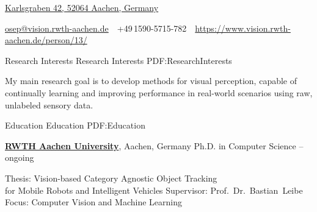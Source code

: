 \documentclass[letterpaper,MMMyyyy,nonstopmode]{simpleresumecv}
\newcommand{\CVAuthor}{Aljoša Ošep}
\newcommand{\CVWebpage}{https://www.vision.rwth-aachen.de/person/13/}
\begin{document}

\Title{\CVAuthor}

\begin{SubTitle}
\href{https://www.google.com/maps/place/Karlsgraben+42,+52064+Aachen}
{Karlsgraben 42, 52064 Aachen, Germany}
\par
\href{mailto:osep@vision.rwth-aachen.de}
{osep@vision.rwth-aachen.de}
\,\SubBulletSymbol\,
+49\,1590-5715-782
\,\SubBulletSymbol\,
\href{\CVWebpage}
{\url{\CVWebpage}}
\end{SubTitle}

\begin{Body}



\Section
{Research Interests}
{Research Interests}
{PDF:ResearchInterests}

My main research goal is to develop methods for visual perception, capable of continually learning and improving performance in real-world scenarios using raw, unlabeled sensory data.



\Section
{Education}
{Education}
{PDF:Education}


\Entry
\href{http://www.rwth-aachen.de}
{\textbf{RWTH Aachen University}},
Aachen, Germany
\Gap
\BulletItem
Ph.D. in Computer Science
\hfill
{} --
ongoing
\begin{Detail}
\SubBulletItem
Thesis:
{Vision-based Category Agnostic Object Tracking \\for Mobile Robots and Intelligent Vehicles}
\SubBulletItem
Supervisor:
Prof.~Dr.~Bastian~Leibe
\SubBulletItem
Focus:
Computer Vision and Machine Learning
\end{Detail}
%


\end{Body}
\end{document}
